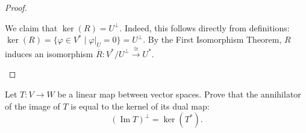 \begin{proof}
\begin{enumerate}
    We claim that $\ker(R) = U^\perp$. Indeed, this follows directly from definitions: $\ker(R) = \{\varphi \in V^* \mid \varphi|_U = 0\} = U^\perp$. 
    By the First Isomorphism Theorem, $R$ induces an isomorphism $\overline{R} \colon V^*/U^\perp \xrightarrow{\cong} U^*$.
  \end{enumerate}
\end{proof}

\begin{exercise}
  Let $T \colon V \to W$ be a linear map between vector spaces. Prove that the annihilator of the image of $T$ is equal to the kernel of its dual map:
  \[ (\operatorname{Im} T)^\perp = \ker(T^*). \]
\end{exercise}